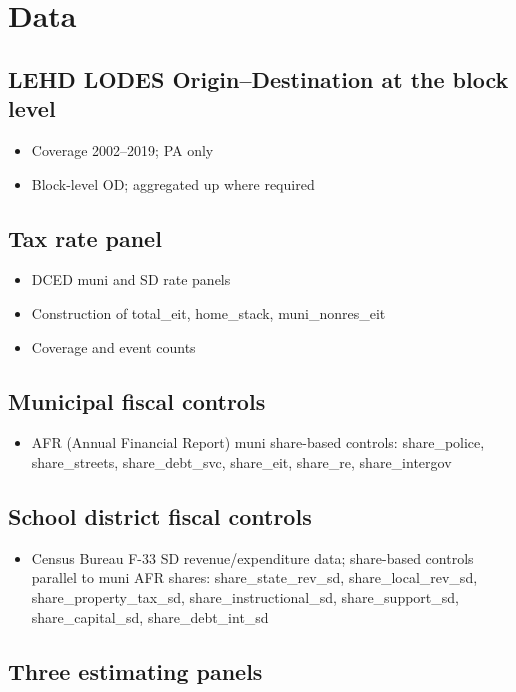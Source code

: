 \documentclass{article}
\begin{document}
\section{Data}

\subsection{LEHD LODES Origin--Destination at the block level}
\begin{itemize}
  \item Coverage 2002--2019; PA only
  \item Block-level OD; aggregated up where required
\end{itemize}

\subsection{Tax rate panel}
\begin{itemize}
  \item DCED muni and SD rate panels
  \item Construction of total\_eit, home\_stack, muni\_nonres\_eit
  \item Coverage and event counts
\end{itemize}

\subsection{Municipal fiscal controls}
\begin{itemize}
  \item AFR (Annual Financial Report) muni share-based controls:
    share\_police, share\_streets, share\_debt\_svc,
    share\_eit, share\_re, share\_intergov
\end{itemize}

\subsection{School district fiscal controls}
\begin{itemize}
  \item Census Bureau F-33 SD revenue/expenditure data; share-based
    controls parallel to muni AFR shares: share\_state\_rev\_sd,
    share\_local\_rev\_sd, share\_property\_tax\_sd,
    share\_instructional\_sd, share\_support\_sd, share\_capital\_sd,
    share\_debt\_int\_sd
\end{itemize}

\subsection{Three estimating panels}
\end{document}
